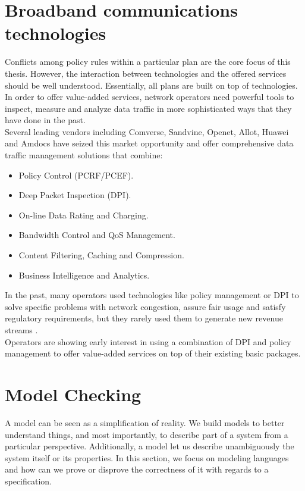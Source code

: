 \section{Broadband communications technologies}
\noindent
Conflicts among policy rules within a particular plan are the core focus of this thesis. However, the interaction between technologies and the offered services should be well understood. Essentially, all plans are built on top of technologies.\\ 

In order to offer value-added services, network operators need powerful tools to inspect, measure and analyze data traffic in more sophisticated ways that they have done in the past. \\

Several leading vendors including Comverse, Sandvine, Openet, Allot, Huawei and Amdocs have seized this market opportunity and offer comprehensive data traffic management solutions that combine:
  \begin{itemize}
      \item Policy Control (PCRF/PCEF).
      \item Deep Packet Inspection (DPI).
      \item On-line Data Rating and Charging.
	  \item Bandwidth Control and QoS Management.
      \item Content Filtering, Caching and Compression.
	  \item Business Intelligence and Analytics.
    \end{itemize} \bigskip

In the past, many operators used technologies like policy management or DPI to solve specific problems with network congestion, assure fair usage and satisfy regulatory requirements, but they rarely used them to generate new revenue streams \cite{Kimbler2012}.\\	

Operators are showing early interest in using a combination of DPI and policy management to offer value-added services on top of their existing basic packages.

\section{Model Checking}
\noindent
A model can be seen as a simplification of reality. We build models to better understand things, and most importantly, to describe part of a system from a particular perspective. Additionally, a model let us describe unambiguously the system itself or its properties. In this section, we focus on modeling languages and how can we prove or disprove the correctness of it with regards to a specification. \\

